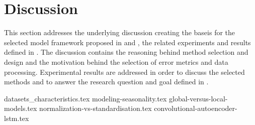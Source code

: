
\section{Discussion}
\label{section:Discussion:Discussion}

This section addresses the underlying discussion creating the baseis for the selected model framework proposed in  and ,
the related experiments and results defined in .
The discussion contains the reasoning behind method selection and design
and the motivation behind the selection of error metrics and data processing.
Experimental results are addressed in order to discuss the selected methods and to answer the research question and goal defined in .


\iffalse
  This section presents the underlying discussion creating the basis for the model framework proposed in \Cref{section:Architecture}.
  The discussion concerns the current state of time series prediction, the motivation behind the method selection, model structure, and the selected error metric.
  This section intendeds to answer the research questions proposed in this thesis,
  as well as the reason behind the framework.
\fi




{datasets_characteristics.tex}
{modeling-seasonality.tex}
{global-versus-local-models.tex}
{normalization-vs-standardisation.tex}
{convolutional-autoencoder-lstm.tex}













